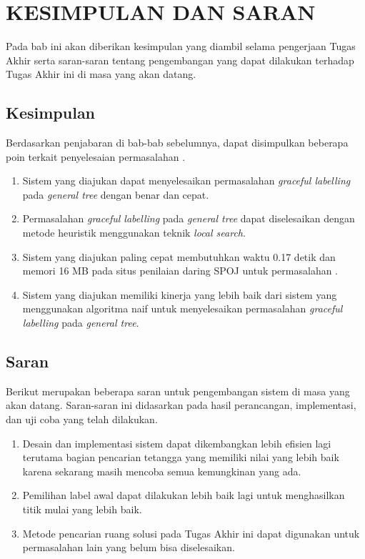 \chapter{KESIMPULAN DAN SARAN}
Pada bab ini akan diberikan kesimpulan yang diambil selama pengerjaan Tugas Akhir serta saran-saran tentang pengembangan yang dapat dilakukan terhadap Tugas Akhir ini di masa yang akan datang.

\section{Kesimpulan}
Berdasarkan penjabaran di bab-bab sebelumnya, dapat disimpulkan beberapa poin terkait penyelesaian permasalahan \problem.
\begin{enumerate}
	\item Sistem yang diajukan dapat menyelesaikan permasalahan \textit{graceful labelling} pada \textit{general tree} dengan benar dan cepat.
	\item Permasalahan \textit{graceful labelling} pada \textit{general tree} dapat diselesaikan dengan metode heuristik menggunakan teknik \textit{local search}.
	\item Sistem yang diajukan paling cepat membutuhkan waktu 0.17 detik dan memori 16 MB pada situs penilaian daring SPOJ untuk permasalahan \problem.
	\item Sistem yang diajukan memiliki kinerja yang lebih baik dari sistem yang menggunakan algoritma naif untuk menyelesaikan permasalahan \textit{graceful labelling} pada \textit{general tree}.
\end{enumerate}

\section{Saran}
Berikut merupakan beberapa saran untuk pengembangan sistem di masa yang akan datang. Saran-saran ini didasarkan pada hasil perancangan, implementasi, dan uji coba yang telah dilakukan.
\begin{enumerate}
	\item Desain dan implementasi sistem dapat dikembangkan lebih efisien lagi terutama bagian pencarian tetangga yang memiliki nilai yang lebih baik karena sekarang masih mencoba semua kemungkinan yang ada.
	\item Pemilihan label awal dapat dilakukan lebih baik lagi untuk menghasilkan titik mulai yang lebih baik.
	\item Metode pencarian ruang solusi pada Tugas Akhir ini dapat digunakan untuk permasalahan lain yang belum bisa diselesaikan.
\end{enumerate}